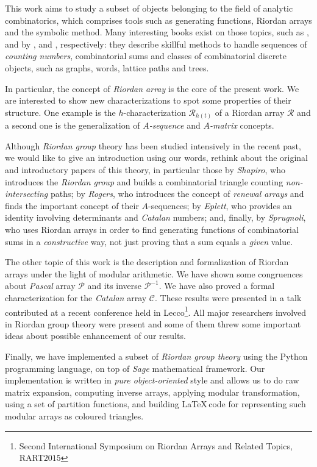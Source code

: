 
This work aims to study
a subset of objects belonging to the field of analytic combinatorics, which
comprises tools such as generating functions, Riordan arrays and the symbolic
method. Many interesting books exist on those topics, such as
\cite{Flajolet:2009:AC:1506267}, \cite{Knuth:1998:ACP:521463} and
\cite{Graham:1994:CMF:562056} by \citeauthor{Flajolet:2009:AC:1506267},
\citeauthor{Knuth:1998:ACP:521463} and \citeauthor{Graham:1994:CMF:562056},
respectively: they describe skillful methods to handle sequences of
\emph{counting numbers}, combinatorial sums and classes of combinatorial
discrete objects, such as graphs, words, lattice paths and trees. 

In particular, the concept of \emph{Riordan array} is the core of the present
work.  We are interested to show new characterizations to spot some properties
of their structure. One example is the $h$-characterization
$\mathcal{R}_{h(t)}$ of a Riordan array $\mathcal{R}$ and a second one is the
generalization of \textit{$A$-sequence} %
and
\textit{$A$-matrix} %
concepts.

Although \emph{Riordan group} theory has been studied intensively in the recent past, we would
like to give an introduction using our words, rethink about the original and
introductory papers of this theory, in particular those by \emph{Shapiro}, who
introduces the \emph{Riordan group} and builds a combinatorial triangle
counting \emph{non-intersecting} paths; by \emph{Rogers}, who introduces the
concept of \emph{renewal arrays} and finds the important concept of their
$A$-sequences; by \emph{Eplett}, who provides an identity involving
determinants and \emph{Catalan} numbers; and, finally, by \emph{Sprugnoli}, who
uses Riordan arrays in order to find generating functions of combinatorial sums
in a \emph{constructive} way, not just proving that a sum equals a \emph{given}
value.%

 The other topic of
this work is the description and formalization of Riordan arrays under the
light of modular arithmetic. We have shown some congruences about \emph{Pascal}
array $\mathcal{P}$ and its inverse $\mathcal{P}^{-1}$. We have also proved a
formal characterization for the \emph{Catalan} array $\mathcal{C}$. These
results were presented in a talk contributed at a recent conference held in
Lecco\footnote{Second International Symposium on Riordan Arrays and Related
Topics, RART$2015$}. All major researchers involved in Riordan group theory
were present and some of them threw some important ideas about possible
enhancement of our results.  

Finally, we have implemented a subset of \emph{Riordan group theory} using the
Python programming language, on top of \emph{Sage} mathematical framework.  Our
implementation is written in \emph{pure object-oriented} style and allows us to
do raw matrix expansion, computing inverse arrays, applying modular
    transformation, using a set of partition functions, and building \LaTeX\,code
    for representing such modular arrays as coloured triangles.

